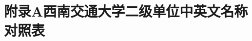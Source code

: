 
\chapter*{附录A\quad 西南交通大学二级单位中英文名称对照表}\label{附录A}	
\setcounter{equation}{0}
\setcounter{figure}{0}
\setcounter{table}{0} 
\renewcommand{\theequation}{A-\arabic{equation}}
\renewcommand{\thefigure}{A-\arabic{figure}}
\renewcommand{\thetable}{A-\arabic{table}}



